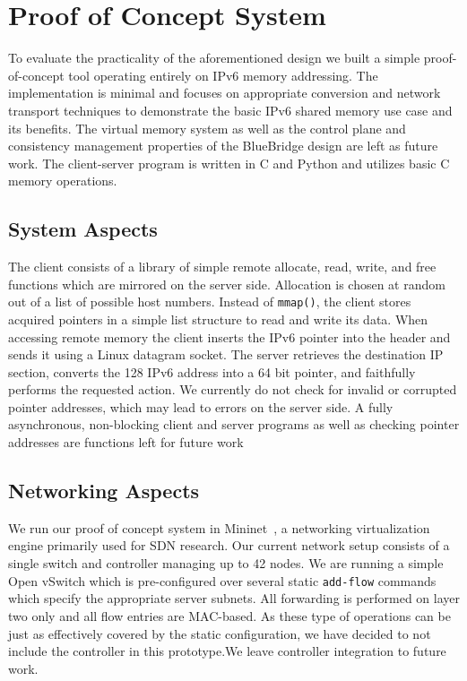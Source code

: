 \section{Proof of Concept System}
\label{sec:implementation}
To evaluate the practicality of the aforementioned design we built a simple proof-of-concept tool operating entirely on IPv6 memory addressing. The implementation is minimal and focuses on appropriate conversion and network transport techniques to demonstrate the basic IPv6 shared memory use case and its benefits. The virtual memory system as well as the control plane and consistency management properties of the BlueBridge design are left as future work.
The client-server program is written in C and Python and utilizes basic C memory operations.
\subsection{System Aspects}
The client consists of a library of simple remote allocate, read, write, and free functions which are mirrored on the server side. Allocation is chosen at random out of a list of possible host numbers. Instead of \texttt{mmap()}, the client stores acquired pointers in a simple list structure to read and write its data. When accessing remote memory the client inserts the IPv6 pointer into the header and sends it using a Linux datagram socket. The server retrieves the destination IP section, converts the 128 IPv6 address into a 64 bit pointer, and faithfully performs the requested action. We currently do not check for invalid or corrupted pointer addresses, which may lead to errors on the server side. A fully asynchronous, non-blocking client and server programs as well as checking pointer addresses are functions left for future work

\subsection{Networking Aspects}
We run our proof of concept system in Mininet~\cite{mininet}, a networking virtualization engine primarily used for SDN research.
Our current network setup consists of a single switch and controller managing up to 42 nodes. We are running a simple Open vSwitch which is pre-configured over several static \texttt{add-flow} commands which specify the appropriate server subnets. 
All forwarding is performed on layer two only and all flow entries are MAC-based. As these type of operations can be just as effectively covered by the static configuration, we have decided to not include the controller in this prototype.We leave controller integration to future work.

